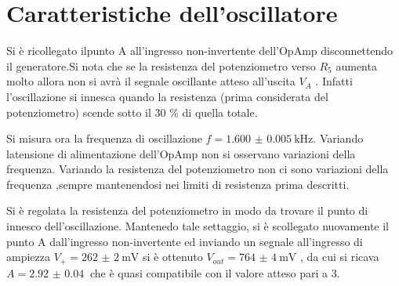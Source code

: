 \section{Caratteristiche dell'oscillatore}
Si è ricollegato ilpunto A all'ingresso non-invertente dell'OpAmp disconnettendo il generatore.Si nota che se la resistenza del potenziometro verso $R_5$ aumenta molto allora non si avrà il segnale oscillante atteso all'uscita $V_A$ . Infatti l'oscillazione si innesca quando la resistenza (prima considerata del potenziometro) scende sotto il 30 \% di quella totale. 

Si misura ora la frequenza di oscillazione $f= \SI{1.600(5)}{\kHz}$. Variando latensione di alimentazione dell'OpAmp non si osservano variazioni della frequenza. Variando la resistenza del potenziometro non ci sono variazioni della frequenza ,sempre mantenendosi nei limiti di resistenza prima descritti.

Si è regolata la resistenza del potenziometro in modo da trovare il punto di innesco dell'oscillazione. Mantenedo tale settaggio, si è scollegato nuovamente il punto A dall'ingresso non-invertente ed inviando un segnale all'ingresso di ampiezza $V_+=\SI{262(2)}{\mV}$ si è ottenuto $V_{out}= \SI{764(4)}{\mV}$ , da cui si ricava $A=\SI{2.92(4)}{}$ che è quasi compatibile con il valore atteso pari a 3.